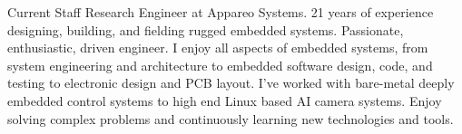 

\begin{cvparagraph}

Current Staff Research Engineer at Appareo Systems. 21 years of experience designing, building, and fielding rugged embedded systems. Passionate, enthusiastic, driven engineer.
I enjoy all aspects of embedded systems, from system engineering and architecture to embedded software design, code, and testing to electronic design and PCB layout. I've worked with bare-metal deeply embedded control systems to high end Linux based AI camera systems. Enjoy solving complex problems and continuously learning new technologies and tools.
\end{cvparagraph}
